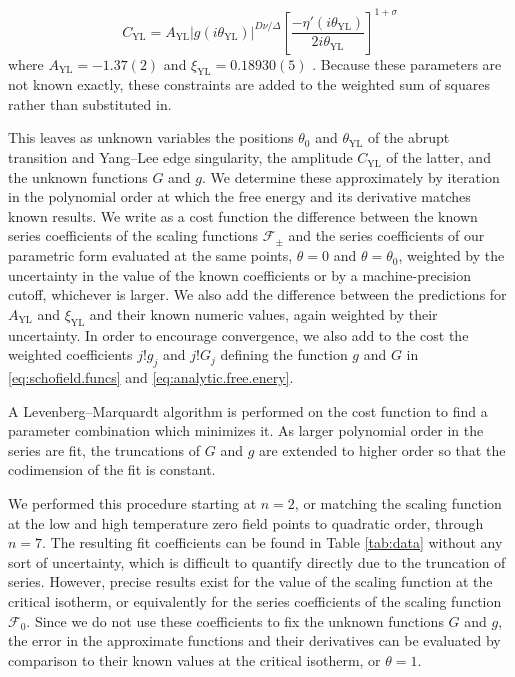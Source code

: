 \documentclass[
aps,
pre,
preprint,
longbibliography,
floatfix
]{revtex4-2}
\begin{document}
\begin{equation}
  C_\mathrm{YL}=A_\mathrm{YL}|g(i\theta_\mathrm{YL})|^{D\nu/\Delta}\left[\frac{-\eta'(i\theta_\mathrm{YL})}{2i\theta_\mathrm{YL}}\right]^{1+\sigma}
\end{equation}
where $A_\mathrm{YL}=-1.37(2)$ and $\xi_\mathrm{YL}=0.18930(5)$
\cite{Fonseca_2003_Ising}. Because these parameters are not known exactly,
these constraints are added to the weighted sum of squares rather than
substituted in.

This leaves as unknown variables the positions $\theta_0$ and
$\theta_{\mathrm{YL}}$ of the abrupt transition and Yang--Lee edge singularity,
the amplitude $C_\mathrm{YL}$ of the latter, and the unknown functions $G$ and
$g$. We determine these approximately by iteration in the polynomial order at
which the free energy and its derivative matches known results. We write as a
cost function the difference between the known series coefficients of the
scaling functions $\mathcal F_\pm$ and the series coefficients of our
parametric form evaluated at the same points, $\theta=0$ and $\theta=\theta_0$,
weighted by the uncertainty in the value of the known coefficients or by a
machine-precision cutoff, whichever is larger. We also add the difference
between the predictions for $A_\mathrm{YL}$ and $\xi_\mathrm{YL}$ and their
known numeric values, again weighted by their uncertainty. In order to
encourage convergence, we also add to the cost the weighted coefficients
$j!g_j$ and $j!G_j$ defining the function $g$ and $G$ in
\eqref{eq:schofield.funcs} and \eqref{eq:analytic.free.enery}.

A Levenberg--Marquardt algorithm is performed on the cost function to find a
parameter combination which minimizes it. As larger polynomial order in the
series are fit, the truncations of $G$ and $g$ are extended to higher order so
that the codimension of the fit is constant.

We performed this procedure starting at $n=2$, or matching the scaling
function at the low and high temperature zero field points to quadratic order,
through $n=7$. The resulting fit coefficients can be found in Table
\ref{tab:data} without any sort of uncertainty, which is difficult to quantify
directly due to the truncation of series. However, precise results exist for
the value of the scaling function at the critical isotherm, or equivalently for
the series coefficients of the scaling function $\mathcal F_0$. Since we do not
use these coefficients to fix the unknown functions $G$ and $g$, the error in
the approximate functions and their derivatives can be evaluated by comparison
to their known values at the critical isotherm, or $\theta=1$.
\end{document}
